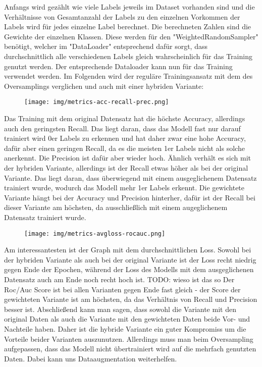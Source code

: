 \documentclass[11pt, a4paper]{article}
\begin{document}
Anfangs wird gezählt wie viele Labels jeweils im Dataset vorhanden sind und die Verhältnisse von Gesamtanzahl der Labels zu den einzelnen Vorkommen der Labels wird für jedes einzelne Label berechnet. Die berechneten Zahlen sind die Gewichte der einzelnen Klassen. Diese werden für den "WeightedRandomSampler" benötigt, welcher im "DataLoader" entsprechend dafür sorgt, dass durchschnittlich alle verschiedenen Labels gleich wahrscheinlich für das Training genutzt werden. Der entsprechende Dataloader kann nun für das Training verwendet werden. Im Folgenden wird der reguläre Trainingsansatz mit dem des Oversamplings verglichen und auch mit einer hybriden Variante:
\begin{figure}[h]
\centering
\texttt{[image: img/metrics-acc-recall-prec.png]}
\end{figure}
Das Training mit dem original Datensatz hat die höchste Accuracy, allerdings auch den geringsten Recall. Das liegt daran, dass das Modell fast nur darauf trainiert wird 0er Labels zu erkennen und hat daher zwar eine hohe Accuracy, dafür aber einen geringen Recall, da es die meisten 1er Labels nicht als solche anerkennt. Die Precision ist dafür aber wieder hoch. Ähnlich verhält es sich mit der hybriden Variante, allerdings ist der Recall etwas höher als bei der original Variante. Das liegt daran, dass überwiegend mit einem ausgeglichenem Datensatz trainiert wurde, wodurch das Modell mehr 1er Labels erkennt. Die gewichtete Variante hängt bei der Accuracy und Precision hinterher, dafür ist der Recall bei dieser Variante am höchsten, da ausschließlich mit einem augeglichenem Datensatz trainiert wurde.
\begin{figure}[h]
\centering
\texttt{[image: img/metrics-avgloss-rocauc.png]}
\end{figure}
Am interessantesten ist der Graph mit dem durchschnittlichen Loss. Sowohl bei der hybriden Variante als auch bei der original Variante ist der Loss recht niedrig gegen Ende der Epochen, während der Loss des Modells mit dem ausgeglichenen Datensatz auch am Ende noch recht hoch ist.
TODO: wieso ist das so
Der Roc/Auc Score ist bei allen Varianten gegen Ende fast gleich - der Score der gewichteten Variante ist am höchsten, da das Verhältnis von Recall und Precision besser ist. Abschließend kann man sagen, dass sowohl die Variante mit den original Daten als auch die Variante mit den gewichteten Daten beide Vor- und Nachteile haben. Daher ist die hybride Variante ein guter Kompromiss um die Vorteile beider Varianten auszunutzen. Allerdings muss man beim Oversampling aufgepassen, dass das Modell nicht übertrainiert wird auf die mehrfach genutzten Daten. Dabei kann uns Dataaugmentation weiterhelfen.
\end{document}
